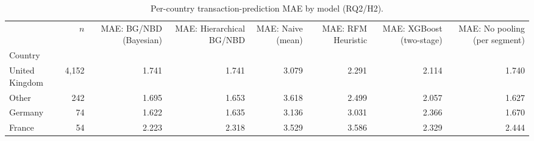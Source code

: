 \begin{table}[htbp]
\centering
\caption{Per-country transaction-prediction MAE by model (RQ2/H2).}
\label{tab:country_mae}
\begin{adjustbox}{max width=\linewidth}
\begin{tabular}{lrrrrrrr}
\toprule
 & $n$ & MAE: BG/NBD (Bayesian) & MAE: Hierarchical BG/NBD & MAE: Naive (mean) & MAE: RFM Heuristic & MAE: XGBoost (two-stage) & MAE: No pooling (per segment) \\
Country &  &  &  &  &  &  &  \\
\midrule
United Kingdom & 4,152 & 1.741 & 1.741 & 3.079 & 2.291 & 2.114 & 1.740 \\
Other & 242 & 1.695 & 1.653 & 3.618 & 2.499 & 2.057 & 1.627 \\
Germany & 74 & 1.622 & 1.635 & 3.136 & 3.031 & 2.366 & 1.670 \\
France & 54 & 2.223 & 2.318 & 3.529 & 3.586 & 2.329 & 2.444 \\
\bottomrule
\end{tabular}
\end{adjustbox}
\end{table}
